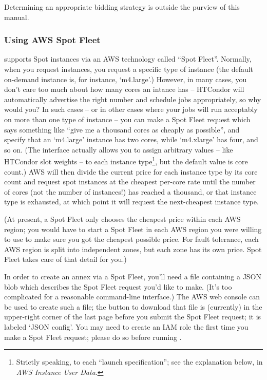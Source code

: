 Determining an appropriate bidding strategy is outside the purview of
this manual.

\subsubsection{Using AWS Spot Fleet}

 supports Spot instances via an AWS technology called
``Spot Fleet''.  Normally, when you request instances, you request a specific
type of instance (the default on-demand instance is, for instance, `m4.large'.)
However, in many cases, you don't care too much about how many cores an
intance has -- HTCondor will automatically advertise the right number and
schedule jobs appropriately, so why would you?  In such cases -- or in
other cases where your jobs will run acceptably on more than one type of
instance -- you can make a Spot Fleet request which says something like
``give me a thousand cores as cheaply as possible'', and specify that
an `m4.large' instance has two cores, while `m4.xlarge' has four, and so
on.  (The interface actually allows you to assign arbitrary values --
like HTCondor slot weights -- to each instance
type\footnote{Strictly speaking, to each ``launch specification''; see
the explanation below, in \emph{AWS Instance User Data}.},
but the default value is core count.)  AWS will then divide the current price for each
instance type by its core count and request spot instances at the cheapest
per-core rate until the number of cores (not the number of instances!) has
reached a thousand, or that instance type is exhausted, at which point it will
request the next-cheapest instance type.

(At present, a Spot Fleet only chooses the cheapest price within each
AWS region; you would have to start a Spot Fleet in each AWS region you
were willing to use to make sure you got the cheapest possible price.  For
fault tolerance, each AWS region is split into independent zones, but each
zone has its own price.  Spot Fleet takes care of that detail for you.)

In order to create an annex via a Spot Fleet, you'll need a file containing
a JSON blob which describes the Spot Fleet request you'd like to make.  (It's
too complicated for a reasonable command-line interface.)  The AWS web
console can be used to create such a file; the button to download that
file is (currently) in the upper-right corner of the last page before
you submit the Spot Fleet request; it is labeled `JSON config'.  You
may need to create an IAM role the first time you make a Spot Fleet
request; please do so before running .

